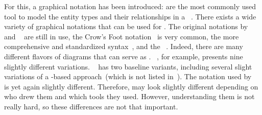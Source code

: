 For this, a graphical notation has been introduced:
 are the most commonly used tool to model the entity types and their relationships in a \db~\cite{C2002ERMHEFTALL,C1975TRMTAUVOD,C1976TERMTAUVOD,KW2012ASHOTEDAIM,WF1995DHQDM,B1990CMERMO}.
There exists a wide variety of graphical notations that can be used for .
The original notations by \citeauthor{B1969DSD}~\cite{B1969DSD} and \citeauthor{C1975TRMTAUVOD}~\cite{C1975TRMTAUVOD,C1976TERMTAUVOD} are still in use, the Crow's Foot notation~\cite{E1976BDSMEWACE,CM2000MDMAUDA} is very common, the more comprehensive and standardized  syntax~\cite{FIPSPUB184,ISOIECIEEE2012ITMLP2SASFII}, and the ~\cite{OMG2017OUMLOU,RMHOSMUUIIIIOPPTRS1997UNG,BRJ1999TUMLRM}.
Indeed, there are many different flavors of diagrams that can serve as .
~\cite{S2024D:CDMERDE}, for example, presents nine slightly different variations.
~\cite{SS2005EIDDDFDB:CDDRAAML} has two baseline variants, including several slight variations of a -based approach~(which is not listed in~\cite{S2024D:CDMERDE}).
The notation used by \citeauthor{V1999C5DMS:CDUTERM}~\cite{V1999C5DMS:CDUTERM} is yet again slightly different.
Therefore,  may look slightly different depending on who drew them and which tools they used.
However, understanding them is not really hard, so these differences are not that important.

